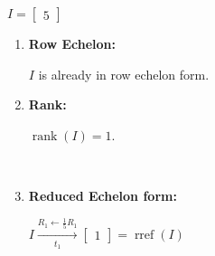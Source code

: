 $I=
\begin{bmatrix}
    5
\end{bmatrix}
$ \\[1.0em]

\begin{enumerate}
    \item
    \textbf{Row Echelon:}
    \begin{answer}
        $I$ is already in row echelon form.
    \end{answer}

    \item
    \textbf{Rank:}
    \begin{answer}
        $\operatorname{rank}(I)=1.$
    \end{answer} \\

    \item
    \textbf{Reduced Echelon form:} \\[1.0em]
    \begin{answer}
        $I \xrightarrow[t_1]{R_1 \leftarrow \frac{1}{5}R_1}
        \begin{bmatrix}
            1
        \end{bmatrix}
        = \operatorname{rref}(I)$
    \end{answer}
\end{enumerate}
